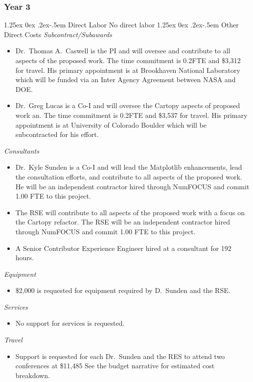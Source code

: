 \documentclass[12pt]{article}
\makeatletter
\numberwithin{page}{section}
\renewcommand{\paragraph}{%
  \@startsection{paragraph}{4}%
  {\z@}{1.25ex \@plus 0ex \@minus .2ex}{-.5em}%
  {\normalfont\normalsize\itshape\bfseries}%
}
\makeatother
\begin{document}
\subsubsection{Year 3}
\paragraph{Direct Labor}
No direct labor
\paragraph{Other Direct Costs}
\textit{Subcontract/Subawards}
\begin{itemize}
  \item Dr.\ Thomas A.\ Caswell is the PI and will oversee and contribute to
    all aspects of the proposed work.  The time commitment is 0.2FTE and \$3,312
    for travel.  His primary appointment is at Brookhaven National Laboratory
    which will be funded via an Inter Agency Agreement between NASA and DOE.
\item Dr.\ Greg Lucas is a Co-I and will oversee the Cartopy aspects of
  proposed work an.  The time commitment is 0.2FTE and \$3,537 for travel.  His
  primary appointment is at University of Colorado Boulder which will be
  subcontracted for his effort.
\end{itemize}
\textit{Consultants}
\begin{itemize}
  \item Dr.\ Kyle Sunden is a Co-I and will lead the Matplotlib enhancements,
    lead the consultation efforts, and contribute to all aspects of the
    proposed work.  He will be an independent contractor hired through NumFOCUS
    and commit
    1.00 FTE to this project.
  \item The RSE will contribute to all aspects of the proposed work with a
    focus on the Cartopy refactor.  The RSE will be an independent contractor hired
    through NumFOCUS and commit 1.00 FTE to this project.
  \item A Senior Contributor Experience Engineer hired at a consultant for 192 hours.

\end{itemize}
\textit{Equipment}
\begin{itemize}
\item \$2,000 is requested for equipment required by D.\ Sunden and the RSE.
\end{itemize}
\textit{Services}
\begin{itemize}
\item No support for services is requested.
\end{itemize}
\textit{Travel}
\begin{itemize}
\item Support is requested for each Dr.\ Sunden and the RES to attend two conferences at
  \$11,485  See the budget narrative for estimated cost  breakdown.
\end{itemize}
\end{document}
